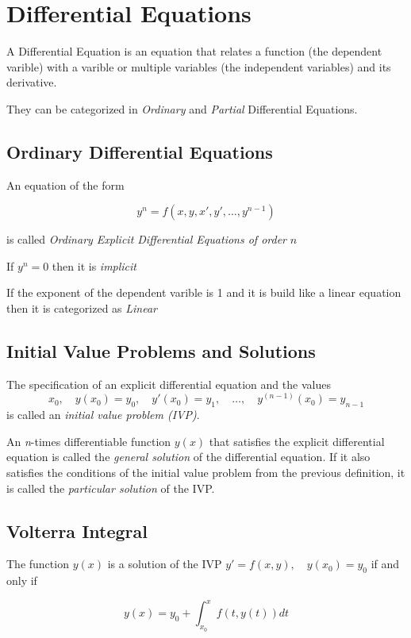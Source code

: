 \section{Differential Equations}

A Differential Equation is an equation that relates a function (the dependent varible)
with a varible or multiple variables (the independent variables) and its derivative.

They can be categorized in \emph{Ordinary} and \emph{Partial} Differential Equations.

\subsection{Ordinary Differential Equations}

An equation of the form 

\[
y^n = f(x, y, x', y', \dots, y^{n -1})
\]

is called \emph{Ordinary Explicit Differential Equations of order} \(n\)

If \(y^n = 0\) then it is \emph{implicit}

If the exponent of the dependent varible is 1 and it
is build like a linear equation then it is categorized as \emph{Linear}

\subsection{Initial Value Problems and Solutions}

The specification of an explicit differential equation and the values
\[
x_0,\quad y(x_0) = y_0,\quad y'(x_0) = y_1,\quad \dots,\quad y^{(n-1)}(x_0) = y_{n-1}
\]
is called an \emph{initial value problem (IVP)}.

An \emph{n}-times differentiable function \( y(x) \) that satisfies 
the explicit differential equation is called the \emph{general solution} of the 
differential equation. If it also satisfies the conditions of the initial value problem 
from the previous definition, it is called the \emph{particular solution} of the IVP.

\subsection{Volterra Integral}

The function \(y(x)\) is a solution of the IVP \(y' = f(x,y),\quad y(x_0) = y_0\) if and only if

\[y(x) = y_0 + \int_{x_0}^{x} f(t, y(t))dt\]

